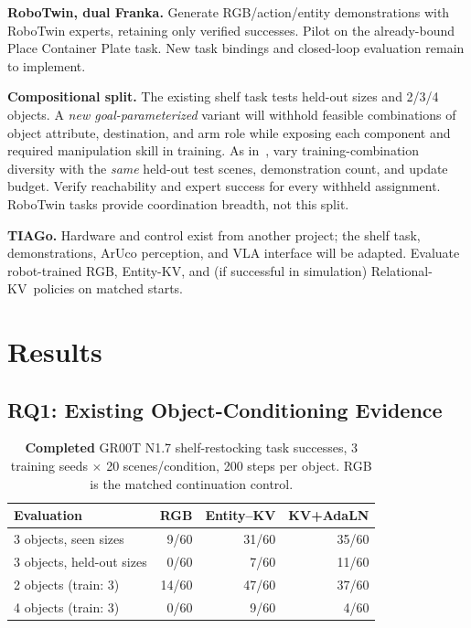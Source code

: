 \documentclass[letterpaper,10pt,conference]{ieeeconf}
\newcommand{\ekv}{Entity-KV}
\newcommand{\rkv}{Relational-KV}
\begin{document}
\textbf{RoboTwin, dual Franka.}
Generate RGB/action/entity demonstrations with RoboTwin experts, retaining only verified successes. Pilot on the already-bound Place Container Plate task. New task bindings and closed-loop evaluation remain to implement.

\textbf{Compositional split.}
The existing shelf task tests held-out sizes and 2/3/4 objects. A \emph{new goal-parameterized} variant will withhold feasible combinations of object attribute, destination, and arm role while exposing each component and required manipulation skill in training. As in~\cite{kapl2026}, vary training-combination diversity with the \emph{same} held-out test scenes, demonstration count, and update budget. Verify reachability and expert success for every withheld assignment. RoboTwin tasks provide coordination breadth, not this split.

\textbf{TIAGo.}
Hardware and control exist from another project; the shelf task, demonstrations, ArUco perception, and VLA interface will be adapted. Evaluate robot-trained RGB, \ekv, and (if successful in simulation) \rkv\ policies on matched starts.

\section{Results}
\label{sec:results}

\subsection{RQ1: Existing Object-Conditioning Evidence}

\begin{table}[!t]
\caption{\textbf{Completed} GR00T N1.7 shelf-restocking task successes, 3 training seeds $\times$ 20 scenes/condition, 200 steps per object. RGB is the matched continuation control.}
\label{tab:existing}
\centering\footnotesize
\begin{tabular}{@{}lrrr@{}}
\toprule
\textbf{Evaluation} & \textbf{RGB} & \textbf{Entity--KV} & \textbf{KV+AdaLN}\\
\midrule
3 objects, seen sizes & 9/60 & 31/60 & 35/60\\
3 objects, held-out sizes & 0/60 & 7/60 & 11/60\\
2 objects (train: 3) & 14/60 & 47/60 & 37/60\\
4 objects (train: 3) & 0/60 & 9/60 & 4/60\\
\bottomrule
\end{tabular}
\end{table}
\end{document}
